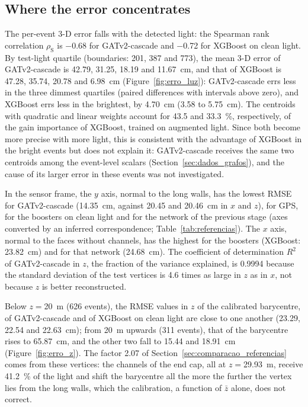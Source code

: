 \subsection{Where the error concentrates}
\label{sec:onde_erro}

The per-event 3-D error falls with the detected light: the Spearman rank correlation $\rho_{\mathrm{S}}$ is \num{-0.68} for GATv2-cascade and \num{-0.72} for XGBoost on clean light. By test-light quartile (boundaries: \num{201}, \num{387} and \qty{773}{\pe}), the mean 3-D error of GATv2-cascade is \num{42.79}, \num{31.25}, \num{18.19} and \qty{11.67}{\cm}, and that of XGBoost is \num{47.28}, \num{35.74}, \num{20.78} and \qty{6.98}{\cm} (Figure~\ref{fig:erro_luz}): GATv2-cascade errs less in the three dimmest quartiles (paired differences with intervals above zero), and XGBoost errs less in the brightest, by \qty{4.70}{\cm} (\num{3.58} to \qty{5.75}{\cm}). The centroids with quadratic and linear weights account for \num{43.5} and \qty{33.3}{\percent}, respectively, of the gain importance of XGBoost, trained on augmented light. Since both become more precise with more light, this is consistent with the advantage of XGBoost in the bright events but does not explain it: GATv2-cascade receives the same two centroids among the event-level scalars (Section~\ref{sec:dados_grafos}), and the cause of its larger error in these events was not investigated.

In the sensor frame, the $y$ axis, normal to the long walls, has the lowest RMSE for GATv2-cascade (\qty{14.35}{\cm}, against \num{20.45} and \qty{20.46}{\cm} in $x$ and $z$), for GPS, for the boosters on clean light and for the network of the previous stage (axes converted by an inferred correspondence; Table~\ref{tab:referencias}). The $x$ axis, normal to the faces without channels, has the highest for the boosters (XGBoost: \qty{23.82}{\cm}) and for that network (\qty{24.68}{\cm}). The coefficient of determination $R^2$ of GATv2-cascade in $z$, the fraction of the variance explained, is \num{0.9994} because the standard deviation of the test vertices is \num{4.6} times as large in $z$ as in $x$, not because $z$ is better reconstructed.

Below $z = {}$\qty{20}{\m} (\num{626} events), the RMSE values in $z$ of the calibrated barycentre, of GATv2-cascade and of XGBoost on clean light are close to one another (\num{23.29}, \num{22.54} and \qty{22.63}{\cm}); from \qty{20}{\m} upwards (\num{311} events), that of the barycentre rises to \qty{65.87}{\cm}, and the other two fall to \num{15.44} and \qty{18.91}{\cm} (Figure~\ref{fig:erro_z}). The factor \num{2.07} of Section~\ref{sec:comparacao_referencias} comes from these vertices: the channels of the end cap, all at $z = {}$\qty{29.93}{\m}, receive \qty{41.2}{\percent} of the light and shift the barycentre all the more the further the vertex lies from the long walls, which the calibration, a function of $\bar{z}$ alone, does not correct.

